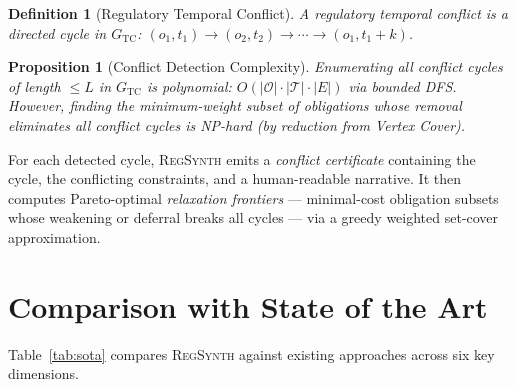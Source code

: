 \documentclass[11pt,twocolumn]{article}
\newtheorem{definition}{Definition}
\newtheorem{proposition}{Proposition}
\newcommand{\regsynth}{\textsc{RegSynth}}
\begin{document}
\begin{definition}[Regulatory Temporal Conflict]
A \emph{regulatory temporal conflict} is a directed cycle in $G_{\text{TC}}$:
$(o_1, t_1) \to (o_2, t_2) \to \cdots \to (o_1, t_1{+}k)$.
\end{definition}

\begin{proposition}[Conflict Detection Complexity]
\label{prop:conflict-detect}
Enumerating all conflict cycles of length $\leq L$ in $G_{\text{TC}}$ is
polynomial: $O(|\mathcal{O}| \cdot |\mathcal{T}| \cdot |E|)$ via bounded DFS.
However, finding the minimum-weight subset of obligations whose removal
eliminates all conflict cycles is NP-hard (by reduction from Vertex Cover).
\end{proposition}

For each detected cycle, \regsynth{} emits a \emph{conflict certificate}
containing the cycle, the conflicting constraints, and a human-readable
narrative. It then computes Pareto-optimal \emph{relaxation frontiers} —
minimal-cost obligation subsets whose weakening or deferral breaks all cycles —
via a greedy weighted set-cover approximation.

\section{Comparison with State of the Art}
\label{sec:sota}

Table~\ref{tab:sota} compares \regsynth{} against existing approaches across six
key dimensions.
\end{document}
